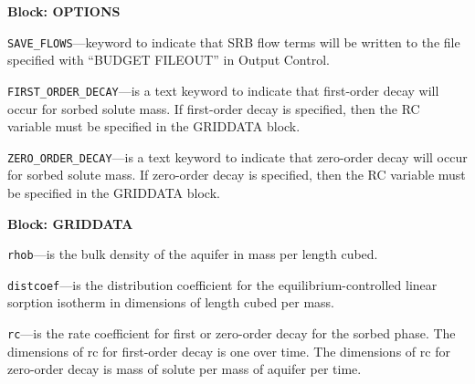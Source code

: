 
\item \textbf{Block: OPTIONS}

\begin{description}
\item \texttt{SAVE\_FLOWS}---keyword to indicate that SRB flow terms will be written to the file specified with ``BUDGET FILEOUT'' in Output Control.

\item \texttt{FIRST\_ORDER\_DECAY}---is a text keyword to indicate that first-order decay will occur for sorbed solute mass.  If first-order decay is specified, then the RC variable must be specified in the GRIDDATA block.

\item \texttt{ZERO\_ORDER\_DECAY}---is a text keyword to indicate that zero-order decay will occur for sorbed solute mass. If zero-order decay is specified, then the RC variable must be specified in the GRIDDATA block.

\end{description}
\item \textbf{Block: GRIDDATA}

\begin{description}
\item \texttt{rhob}---is the bulk density of the aquifer in mass per length cubed.

\item \texttt{distcoef}---is the distribution coefficient for the equilibrium-controlled linear sorption isotherm in dimensions of length cubed per mass.

\item \texttt{rc}---is the rate coefficient for first or zero-order decay for the sorbed phase.  The dimensions of rc for first-order decay is one over time.  The dimensions of rc for zero-order decay is mass of solute per mass of aquifer per time.

\end{description}

